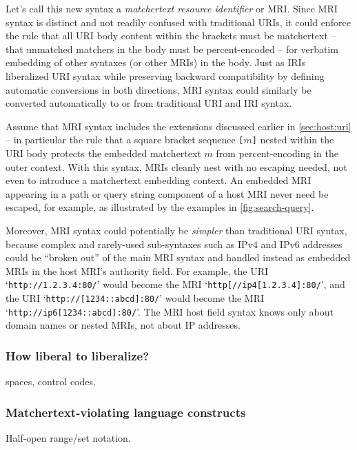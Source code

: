 Let's call this new syntax
a \emph{matchertext resource identifier} or MRI.
Since MRI syntax is distinct and not readily confused with traditional URIs,
it could enforce the rule that all URI body content within the brackets
must be matchertext --
\ie that unmatched matchers in the body must be percent-encoded --
for verbatim embedding of other syntaxes (or other MRIs) in the body.
Just as IRIs~\cite{rfc3987} liberalized URI syntax
while preserving backward compatibility
by defining automatic conversions in both directions,
MRI syntax could similarly be converted automatically
to or from traditional URI and IRI syntax.

Assume that MRI syntax includes the extensions
discussed earlier in \cref{sec:host:uri} --
in particular the rule that a square bracket sequence \verb|[|$m$\verb|]|
nested within the URI body protects the embedded matchertext $m$
from percent-encoding in the outer context.
With this syntax, MRIs cleanly nest with no escaping needed,
not even to introduce a matchertext embedding context.
An embedded MRI appearing in a path or query string component
of a host MRI never need be escaped, for example,
as illustrated by the examples in \cref{fig:search-query}.

Moreover, MRI syntax could potentially be \emph{simpler}
than traditional URI syntax,
because complex and rarely-used sub-syntaxes such as IPv4 and IPv6 addresses
could be ``broken out'' of the main MRI syntax
and handled instead as embedded MRIs in the host MRI's authority field.
For example,
the URI `\verb|http://1.2.3.4:80/|' would become
the MRI `\verb|http[//ip4[1.2.3.4]:80/|', and
the URI `\verb|http://[1234::abcd]:80/|' would become
the MRI `\verb|http://ip6[1234::abcd]:80/|'.
The MRI host field syntax knows only about domain names or nested MRIs,
not about IP addresses.




\subsubsection{How liberal to liberalize?}
\label{sec:embed:mri:liberal}

spaces, control codes.



\subsubsection{Matchertext-violating language constructs}

Half-open range/set notation.



